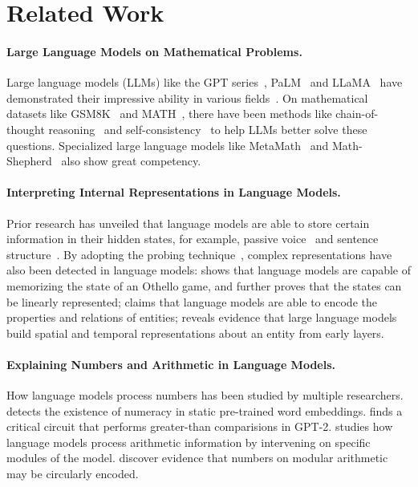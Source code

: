\documentclass[11pt]{article}
\begin{document}
\section{Related Work}
\paragraph{Large Language Models on Mathematical Problems.}
Large language models (LLMs) like the GPT series~\cite{openai2023gpt4}, PaLM~\cite{anil2023palm} and LLaMA~\cite{touvron2023llama, touvron2023llama2} have demonstrated their impressive ability in various fields~\cite{zhao2023verify, li2023chain, taori2023stanford, chen2021evaluating, nijkamp2022codegen, li2023starcoder}.
On mathematical datasets like GSM8K~\cite{cobbe2021training} and MATH~\cite{hendrycks2021measuring}, there have been methods like chain-of-thought reasoning~\cite{wei2022chain} and self-consistency~\cite{wang2022self} to help LLMs better solve these questions.
Specialized large language models like MetaMath~\cite{yu2023metamath} and Math-Shepherd~\cite{wang2023math} also show great competency.

\paragraph{Interpreting Internal Representations in Language Models.}
Prior research has unveiled that language models are able to store certain information in their hidden states, for example, passive voice~\cite{shi2016does} and sentence structure~\cite{tenney2018you}.
By adopting the probing technique~\cite{alain2016understanding, belinkov2022probing}, complex representations have also been detected in language models:
\citet{li2022emergent} shows that language models are capable of memorizing the state of an Othello game, and \citet{nanda2023emergent} further proves that the states can be linearly represented;
\citet{li2021implicit} claims that language models are able to encode the properties and relations of entities;
\citet{gurnee2023language} reveals evidence that large language models build spatial and temporal representations about an entity from early layers.

\paragraph{Explaining Numbers and Arithmetic in Language Models.}
How language models process numbers has been studied by multiple researchers.
\citet{wallace2019nlp} detects the existence of numeracy in static pre-trained word embeddings.
\citet{hanna2024does} finds a critical circuit that performs greater-than comparisions in GPT-2.
\citet{stolfo2023mechanistic} studies how language models process arithmetic information by intervening on specific modules of the model.
\citet{zhong2024clock, engels2024not} discover evidence that numbers on modular arithmetic may be circularly encoded.
\end{document}
